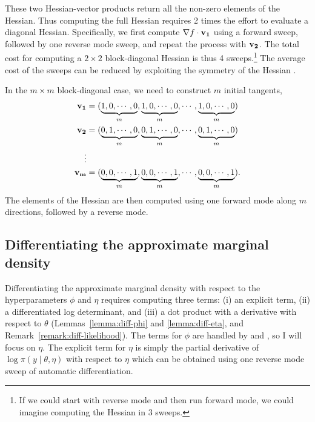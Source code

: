 \documentclass[stslayout, noinfoline]{imsart}
\theoremstyle{definition}
\begin{document}
%
These two Hessian-vector products return all the non-zero elements of the Hessian.
Thus computing the full Hessian requires 2 times the effort to evaluate a diagonal Hessian.
Specifically, we first compute $\nabla f \cdot {\bf v_1}$ using a forward sweep, followed by one reverse mode sweep, and repeat the process with ${\bf v_2}$.
The total cost for computing a $2\times2$ block-diagonal Hessian is thus 4 sweeps.\footnote{If we could start with reverse mode and then run forward mode, we could imagine computing the Hessian in 3 sweeps.}
The average cost of the sweeps can be reduced by exploiting the symmetry of the Hessian \citep[e.g][]{Griewank:2008, Gower:2011}.
 
In the $m \times m$ block-diagonal case, we need to construct $m$ initial tangents,
%
\begin{eqnarray} \label{eq:init-tangents-v}
  \bf v_1 & = (\underbrace{1, 0, \cdots, 0}_m, \underbrace{1, 0, \cdots, 0}_m, \cdots, \underbrace{1, 0, \cdots, 0}_m) \nonumber \\
  \bf v_2 & = (\underbrace{0, 1, \cdots, 0}_m, \underbrace{0, 1, \cdots, 0}_m, \cdots, \underbrace{0, 1, \cdots, 0}_m) \nonumber \\
  \vdots \nonumber \\
  \bf v_{m} & = (\underbrace{0, 0, \cdots, 1}_m, \underbrace{0, 0, \cdots, 1}_m, \cdots, \underbrace{0, 0, \cdots, 1}_m).
\end{eqnarray}
%
The elements of the Hessian are then computed using one forward mode along $m$ directions,
followed by a reverse mode.

\subsection{Differentiating the approximate marginal density} \label{sec:diff-marginal}

Differentiating the approximate marginal density with respect to the hyperparameters $\phi$ and $\eta$ requires computing three terms: (i) an explicit term, (ii) a differentiated log determinant, and (iii) a dot product with a derivative with respect to $\theta$ (Lemmas~\ref{lemma:diff-phi} and \ref{lemma:diff-eta}, and Remark~\ref{remark:diff-likelihood}).
The terms for $\phi$ are handled by \citet{Rasmussen:2006} and \citet{Margossian:2020-laplace},
so I will focus on $\eta$.
The explicit term for $\eta$ is simply the partial derivative of $\log \pi(y \mid \theta, \eta)$ with respect to $\eta$ which can be obtained using one reverse mode sweep of automatic differentiation.
\end{document}
